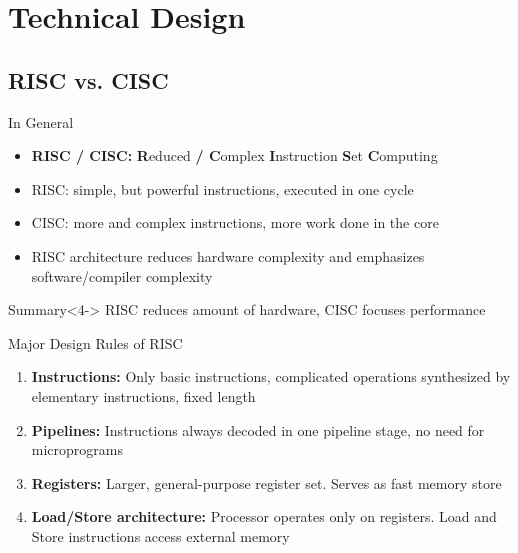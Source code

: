 \documentclass{beamer}
\begin{document}
\section{Technical Design}
\subsection{RISC vs. CISC}
\begin{frame}[t]{In General}
    \begin{itemize}
        \item<1-3,4->\textbf{RISC / CISC:} \textbf{R}educed \textbf{/ C}omplex \textbf{I}nstruction \textbf{S}et \textbf{C}omputing
        \item<2-3,4-> RISC: simple, but powerful instructions, executed in one cycle
        \item<2-3,4-> CISC: more and complex instructions, more work done in the core
        \item<3,4-> RISC architecture reduces hardware complexity and emphasizes software/compiler complexity 
    \end{itemize}
    \begin{alertblock}{Summary}<4->
    RISC reduces amount of hardware, CISC focuses performance
    \end{alertblock}
\end{frame}

\begin{frame}[t]{Major Design Rules of RISC}
    \begin{enumerate}
        \item<1-> \textbf{Instructions:} Only basic instructions, complicated operations synthesized by elementary instructions, fixed length
        \item<2-> \textbf{Pipelines:} Instructions always decoded in one pipeline stage, no need for microprograms
        \item<3-> \textbf{Registers:} Larger, general-purpose register set. Serves as fast memory store
        \item<4-> \textbf{Load/Store architecture:} Processor operates only on registers. Load and Store instructions access external memory
    \end{enumerate}
\end{frame}

\end{document}
